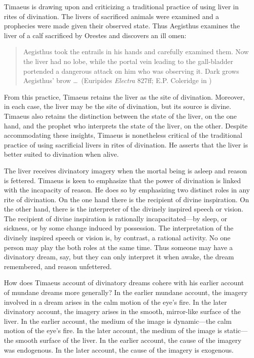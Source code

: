 Timaeus is drawing upon and criticizing a traditional practice of using liver in rites of divination. The livers of sacrificed animals were examined and a prophecies were made given their observed state. Thus Aegisthus examines the liver of a calf sacrificed by Orestes and discovers an ill omen:
\begin{quote}
	Aegisthus took the entrails in his hands and carefully examined them. Now the liver had no lobe, while the portal vein leading to the gall-bladder portended a dangerous attack on him who was observing it. Dark grows Aegis\-thus' brow \ldots\ (Euripides \emph{Electra} 827ff; E.P. Coleridge in \citealt[92]{Oates:1938la})
\end{quote}
From this practice, Timaeus retains the liver as the site of divination. Moreover, in each case, the liver may be the site of divination, but its source is divine. Timaeus also retains the distinction between the state of the liver, on the one hand, and the prophet who interprets the state of the liver, on the other. Despite accommodating these insights, Timaeus is nonetheless critical of the traditional practice of using sacrificial livers in rites of divination. He asserts that the liver is better suited to divination when alive.

The liver receives divinatory imagery when the mortal being is asleep and reason is fettered. Timaeus is keen to emphasize that the power of divination is linked with the incapacity of reason. He does so by emphasizing two distinct roles in any rite of divination. On the one hand there is the recipient of divine inspiration. On the other hand, there is the interpreter of the divinely inspired speech or vision. The recipient of divine inspiration is rationally incapacitated---by sleep, or sickness, or by some change induced by possession. The interpretation of the divinely inspired speech or vision is, by contrast, a rational activity. No one person may play the both roles at the same time. Thus someone may have a divinatory dream, say, but they can only interpret it when awake, the dream remembered, and reason unfettered.

How does Timaeus account of divinatory dreams cohere with his earlier account of mundane dreams more generally? In the earlier mundane account, the imagery involved in a dream arises in the calm motion of the eye's fire. In the later divinatory account, the imagery arises in the smooth, mirror-like surface of the liver. In the earlier account, the medium of the image is dynamic---the calm motion of the eye's fire. In the later account, the medium of the image is static---the smooth surface of the liver. In the earlier account, the cause of the imagery was endogenous. In the later account, the cause of the imagery is exogenous. 

